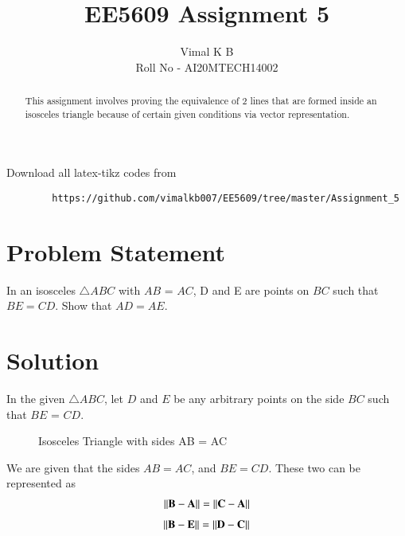 \documentclass[journal,12pt,twocolumn]{IEEEtran}
\begin{document}
	
	
	\title{EE5609 Assignment 5}
	\author{Vimal K B \\Roll No - AI20MTECH14002}
	
	\maketitle
	\newpage
	\bigskip
	
	\renewcommand{\thefigure}{\theenumi}
	\renewcommand{\thetable}{\theenumi}
	
	\begin{abstract}
		This assignment involves proving the equivalence of 2 lines that are formed inside an isosceles triangle because of certain given conditions via vector representation.
	\end{abstract}

	Download all latex-tikz codes from 
	
	\begin{lstlisting}
		https://github.com/vimalkb007/EE5609/tree/master/Assignment_5
	\end{lstlisting}
	
	\section{Problem Statement}
In an isosceles $\triangle ABC$ with $AB$ = $AC$, D and E are points on $BC$ such that $BE = CD$. Show that $AD = AE$. 
	\section{Solution}
	
	In the given  $\triangle ABC$, let $D$ and $E$ be any arbitrary points on the side $BC$ such that $BE$ = $CD$.
	
	\renewcommand{\thefigure}{1}
	\begin{figure}[!ht] \label{fig:two_triangles}
		\centering
		\resizebox{\columnwidth}{!}{}
		\caption{Isosceles Triangle with sides AB = AC}
	\end{figure}
	We are given that the sides $AB = AC$, and $BE = CD$. These two can be represented as
	\begin{align}\label{eq:fact1}
		\left\lVert\mathbf{B}-\mathbf{A}\right\rVert = \left\lVert\mathbf{C}-\mathbf{A}\right\rVert
	\end{align}
	\begin{align}\label{eq:fact2}
		\left\lVert\mathbf{B}-\mathbf{E}\right\rVert = \left\lVert\mathbf{D}-\mathbf{C}\right\rVert
	\end{align}
	
\end{document}
